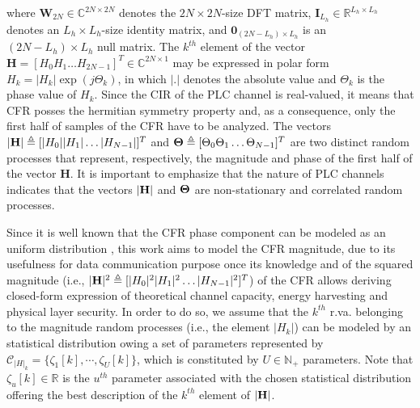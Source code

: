 \documentclass[journal]{IEEEtran}
\begin{document}
where $\mathbf{W}_{2N} \in \mathbb{C}^{2N\times 2N}$ denotes the $2N \times 2N$-size \ac{DFT} matrix, $ \mathbf{I}_{L_h} \in \mathbb{R}^{L_h\times L_h}$ denotes an $L_h\times L_h$-size identity matrix, and $ \mathbf{0}_{(2N-L_{h})\times L_{h}} $ is an $ (2N-L_{h})\times L_{h}$ null matrix. The $k^{th}$ element of the vector $\mathbf{H}=[H_0 H_1 \ldots H_{2N-1}]^T \in \mathbb{C}^{2N\times 1}$ may be expressed in polar form $H_k=|H_k|\exp(j \Theta_k)$, in which $|.|$ denotes the absolute value and $\Theta_k$ is the phase value of $H_k$. Since the \ac{CIR} of the \ac{PLC} channel is real-valued, it means that \ac{CFR} posses the hermitian symmetry property and, as a consequence, only the first half of samples of the \ac{CFR} have to be analyzed. The vectors $|{\bf H}|\triangleq [|H_0||H_1|\ldots |H_{N-1}|]^T$ and ${\bf \Theta}\triangleq[\Theta_0\Theta_1\ldots \Theta_{N-1}]^T$ are two distinct random processes that represent, respectively, the magnitude and phase of the first half of the vector $\mathbf{H}$. It is important to emphasize that the nature of \ac{PLC} channels indicates that the vectors $|{\bf H}|$ and ${\bf \Theta}$ are non-stationary and correlated random processes. 

Since it is well known that the \ac{CFR} phase component can be modeled as an uniform distribution \cite{unif_phase}, this work aims to model the \ac{CFR} magnitude, due to its usefulness for data communication purpose once its knowledge and of the squared magnitude (i.e.,  $|{\bf H}|^2\triangleq[|H_0|^2|H_1|^2\ldots |H_{N-1}|^2]^T$) of the \ac{CFR} allows deriving closed-form expression of theoretical channel capacity, energy harvesting and physical layer security. In order to do so, we assume that the $k^{th}$ \ac{r.va.} belonging to the magnitude random processes (i.e., the element $|H_k|$) can be modeled by an statistical distribution owing a set of parameters represented by $\mathcal{C}_{|H|_k} = \{ \zeta_{1}[k], \cdots, \zeta_{U}[k] \}$, which is constituted by $U \in \mathbb{N}_+$ parameters. Note that $\zeta_{u}[k] \in \mathbb{R}$ is the $u^{th}$ parameter associated with the chosen statistical distribution offering the best description of the $k^{th}$ element of $|{\bf H}|$.
\end{document}
